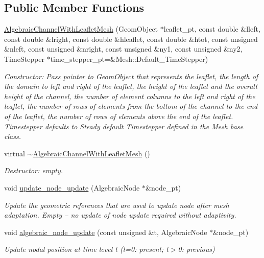 \subsection*{Public Member Functions}
\begin{DoxyCompactItemize}
\item 
\hyperlink{classoomph_1_1AlgebraicChannelWithLeafletMesh_a1e72e11c9971ed132efc95b808c83ccd}{Algebraic\+Channel\+With\+Leaflet\+Mesh} (Geom\+Object $\ast$leaflet\+\_\+pt, const double \&lleft, const double \&lright, const double \&hleaflet, const double \&htot, const unsigned \&nleft, const unsigned \&nright, const unsigned \&ny1, const unsigned \&ny2, Time\+Stepper $\ast$time\+\_\+stepper\+\_\+pt=\&Mesh\+::\+Default\+\_\+\+Time\+Stepper)
\begin{DoxyCompactList}\small\item\em Constructor\+: Pass pointer to Geom\+Object that represents the leaflet, the length of the domain to left and right of the leaflet, the height of the leaflet and the overall height of the channel, the number of element columns to the left and right of the leaflet, the number of rows of elements from the bottom of the channel to the end of the leaflet, the number of rows of elements above the end of the leaflet. Timestepper defaults to Steady default Timestepper defined in the Mesh base class. \end{DoxyCompactList}\item 
virtual \hyperlink{classoomph_1_1AlgebraicChannelWithLeafletMesh_a5b7c6a5f91427eae728c397b38de7c54}{$\sim$\+Algebraic\+Channel\+With\+Leaflet\+Mesh} ()
\begin{DoxyCompactList}\small\item\em Destructor\+: empty. \end{DoxyCompactList}\item 
void \hyperlink{classoomph_1_1AlgebraicChannelWithLeafletMesh_ace3a90b4e530c75bec8301e2291151eb}{update\+\_\+node\+\_\+update} (Algebraic\+Node $\ast$\&node\+\_\+pt)
\begin{DoxyCompactList}\small\item\em Update the geometric references that are used to update node after mesh adaptation. Empty -- no update of node update required without adaptivity. \end{DoxyCompactList}\item 
void \hyperlink{classoomph_1_1AlgebraicChannelWithLeafletMesh_a4c01b99ca83286f872c517fc5269a890}{algebraic\+\_\+node\+\_\+update} (const unsigned \&t, Algebraic\+Node $\ast$\&node\+\_\+pt)
\begin{DoxyCompactList}\small\item\em Update nodal position at time level t (t=0\+: present; t$>$0\+: previous) \end{DoxyCompactList}\end{DoxyCompactItemize}
